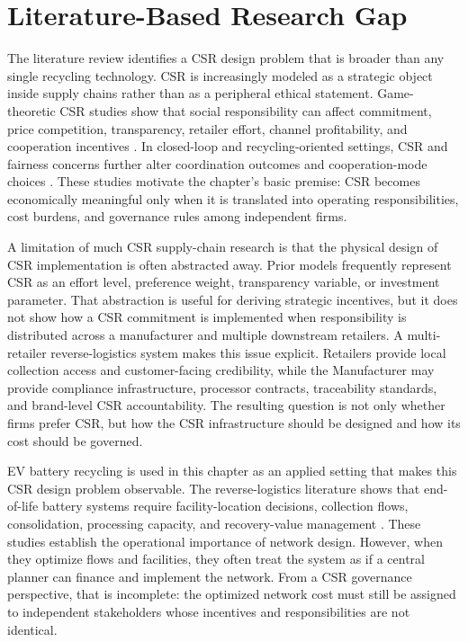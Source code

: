 \section{Literature-Based Research Gap}
\label{sec:ch4_literature_gap}

The literature review identifies a CSR design problem that is broader than any single recycling technology. CSR is increasingly modeled as a strategic object inside supply chains rather than as a peripheral ethical statement. Game-theoretic CSR studies show that social responsibility can affect commitment, price competition, transparency, retailer effort, channel profitability, and cooperation incentives \cite{Buccella2024,FantiBuccella2017,Ferrara2017,Khosroshahi2019,Mahdiraji2023}. In closed-loop and recycling-oriented settings, CSR and fairness concerns further alter coordination outcomes and cooperation-mode choices \cite{ZhangLiang2023,ZhengB2022}. These studies motivate the chapter's basic premise: CSR becomes economically meaningful only when it is translated into operating responsibilities, cost burdens, and governance rules among independent firms.

A limitation of much CSR supply-chain research is that the physical design of CSR implementation is often abstracted away. Prior models frequently represent CSR as an effort level, preference weight, transparency variable, or investment parameter. That abstraction is useful for deriving strategic incentives, but it does not show how a CSR commitment is implemented when responsibility is distributed across a manufacturer and multiple downstream retailers. A multi-retailer reverse-logistics system makes this issue explicit. Retailers provide local collection access and customer-facing credibility, while the Manufacturer may provide compliance infrastructure, processor contracts, traceability standards, and brand-level CSR accountability. The resulting question is not only whether firms prefer CSR, but how the CSR infrastructure should be designed and how its cost should be governed.

EV battery recycling is used in this chapter as an applied setting that makes this CSR design problem observable. The reverse-logistics literature shows that end-of-life battery systems require facility-location decisions, collection flows, consolidation, processing capacity, and recovery-value management \cite{tadaros2022location,bafadal2024proposed,wang2025planning,ma2024unlocking}. These studies establish the operational importance of network design. However, when they optimize flows and facilities, they often treat the system as if a central planner can finance and implement the network. From a CSR governance perspective, that is incomplete: the optimized network cost must still be assigned to independent stakeholders whose incentives and responsibilities are not identical.

